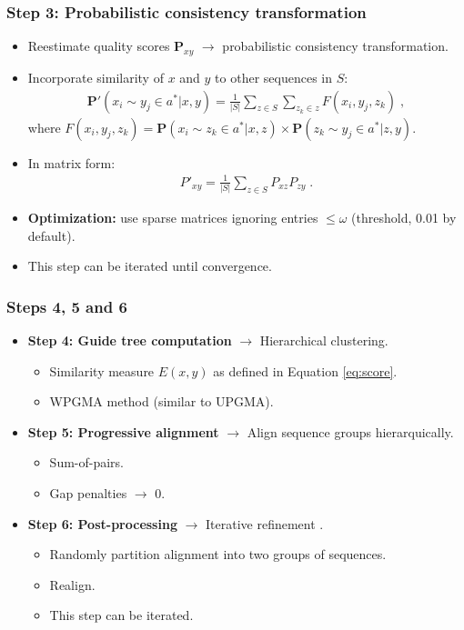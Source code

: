 \begin{frame}
    \frametitle{Step 3: Probabilistic consistency transformation}
    \begin{itemize}
        \item Reestimate quality scores $\pmb{P}_{xy}$ $\rightarrow$ probabilistic consistency transformation.
        \item Incorporate similarity of $x$ and $y$ to other sequences in $S$:
        \begin{align*}
            {\pmb{P}}'(x_i \sim y_j \in a^* | x, y) = \frac{1}{|S|} \sum_{z\in S} \sum_{z_k \in z} F(x_i, y_j, z_k) \;,
        \end{align*}
        where $F(x_i, y_j, z_k) =  {\pmb{P}}(x_i \sim z_k \in a^* | x, z) \times {\pmb{P}}(z_k \sim y_j \in a^* | z, y) $.
        \item In matrix form:
        \begin{align*}
            {P'}_{xy} = \frac{1}{|S|} \sum_{z\in S} P_{xz}P_{zy} \;.
        \end{align*}
        \item \textbf{Optimization: }use sparse matrices ignoring entries $\leq \omega$ (threshold, 0.01 by default).
        \item This step can be iterated until convergence.
    \end{itemize}
\end{frame}

\begin{frame}
    \frametitle{Steps 4, 5 and 6}
    \begin{itemize}
        \item \textbf{Step 4: Guide tree computation} $\rightarrow$ Hierarchical clustering.
        \begin{itemize}
          \item Similarity measure $E(x,y)$ as defined in Equation \eqref{eq:score}.
          \item WPGMA method (similar to UPGMA).
        \end{itemize}
        \item \textbf{Step 5: Progressive alignment} $\rightarrow$ Align sequence groups hierarquically.
        \begin{itemize}
            \item Sum-of-pairs.
            \item Gap penalties $\rightarrow$ $0$.
        \end{itemize}
        \item \textbf{Step 6: Post-processing} $\rightarrow$ Iterative refinement \cite{wallace2005multiple}.
        \begin{itemize}
            \item Randomly partition alignment into two groups of sequences.
            \item Realign.
            \item This step can be iterated.
        \end{itemize}
    \end{itemize}
\end{frame}